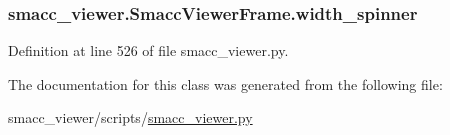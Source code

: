 \subsubsection[{\texorpdfstring{width\+\_\+spinner}{width_spinner}}]{\setlength{\rightskip}{0pt plus 5cm}smacc\+\_\+viewer.\+Smacc\+Viewer\+Frame.\+width\+\_\+spinner}\hypertarget{classsmacc__viewer_1_1SmaccViewerFrame_a9e092051eb4c76d6721dcea6c5c48cde}{}\label{classsmacc__viewer_1_1SmaccViewerFrame_a9e092051eb4c76d6721dcea6c5c48cde}


Definition at line 526 of file smacc\+\_\+viewer.\+py.



The documentation for this class was generated from the following file\+:\begin{DoxyCompactItemize}
\item 
smacc\+\_\+viewer/scripts/\hyperlink{smacc__viewer_8py}{smacc\+\_\+viewer.\+py}\end{DoxyCompactItemize}
